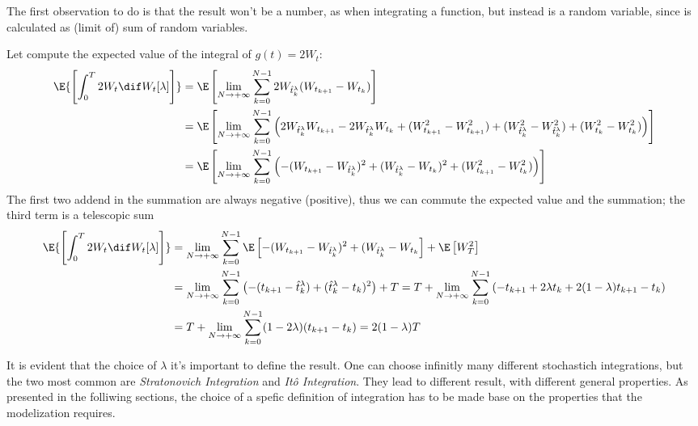 The first observation to do is that the result won't be a number, as when 
integrating a function, but instead is a random variable, since is calculated as
(limit of) sum of random variables.
\begin{Example}
  Let compute the expected value of the integral of \(g{(t)}=2W_t\):
  \[\begin{split}
    \E{\left[\int_0^T 2W_t \dif W_t{[\lambda]}\right]}
      &= \E\left[\lim_{N\to+\infty} \sum_{k=0}^{N-1}2W_{\hat{t}_k^\lambda}(W_{t_{k+1}}-W_{t_k})\right] \\
      &= \E\left[\lim_{N\to+\infty} \sum_{k=0}^{N-1}\left(2W_{\hat{t}_k^\lambda}W_{t_{k+1}}-2W_{\hat{t}_k^\lambda}W_{t_k}
                +(W^2_{t_{k+1}} - W^2_{t_{k+1}}) + (W^2_{\hat{t}_k^\lambda}-W^2_{\hat{t}_k^\lambda}) + (W^2_{t_k}-W^2_{t_k})\right)\right] \\
      &= \E\left[\lim_{N\to+\infty} \sum_{k=0}^{N-1}\left(-(W_{t_{k+1}}-W_{\hat{t}_k^\lambda})^2 + (W_{\hat{t}_k^\lambda}-W_{t_{k}})^2 + (W^2_{t_{k+1}} - W^2_{t_{k}}) \right)\right]
  \end{split}\]
  The first two addend in the summation are always negative (positive), thus we can commute
  the expected value and the summation; the third term is a telescopic sum
  \[\begin{split}
    \E{\left[\int_0^T 2W_t \dif W_t{[\lambda]}\right]}
      &= \lim_{N\to+\infty} \sum_{k=0}^{N-1}\E\left[-(W_{t_{k+1}}-W_{\hat{t}_k^\lambda})^2 + (W_{\hat{t}_k^\lambda}-W_{t_{k}}\right] + \E\left[W^2_{T}\right] \\
      &= \lim_{N\to+\infty} \sum_{k=0}^{N-1}\left(-(t_{k+1}-\hat{t}_k^\lambda) + (\hat{t}_k^\lambda-t_{k})^2\right) + T 
      = T + \lim_{N\to+\infty} \sum_{k=0}^{N-1}\left(-t_{k+1}+2\lambda t_k + 2(1-\lambda)t_{k+1}-t_k\right) \\
      &= T + \lim_{N\to+\infty} \sum_{k=0}^{N-1}(1-2\lambda)(t_{k+1}-t_k) = 2(1-\lambda)T
  \end{split}\]
\end{Example}
It is evident that the choice of \(\lambda\) it's important to define the result.
One can choose infinitly many different stochastich integrations, but the two most common
are \emph{Stratonovich Integration} and \emph{Itô Integration}. They lead to different result,
with different general properties. As presented in the folliwing sections, the choice of a spefic
definition of integration has to be made base on the properties that the modelization requires.

